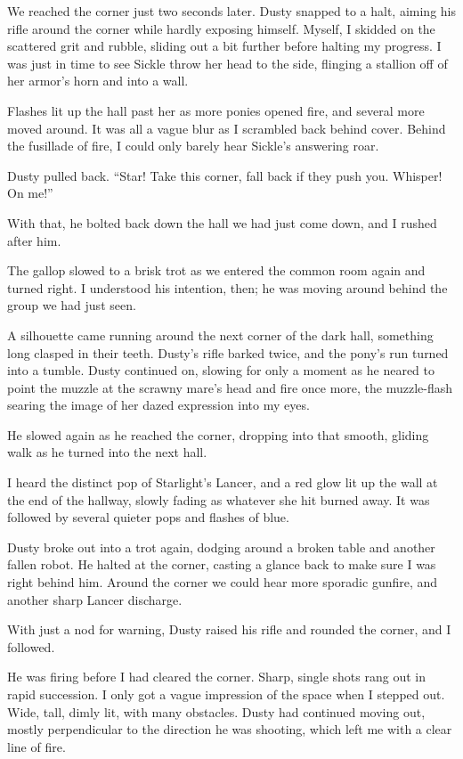We reached the corner just two seconds later. Dusty snapped to a halt, aiming his rifle around the corner while hardly exposing himself. Myself, I skidded on the scattered grit and rubble, sliding out a bit further before halting my progress. I was just in time to see Sickle throw her head to the side, flinging a stallion off of her armor’s horn and into a wall.

Flashes lit up the hall past her as more ponies opened fire, and several more moved around. It was all a vague blur as I scrambled back behind cover. Behind the fusillade of fire, I could only barely hear Sickle’s answering roar.

Dusty pulled back. “Star! Take this corner, fall back if they push you. Whisper! On me!”

With that, he bolted back down the hall we had just come down, and I rushed after him.

The gallop slowed to a brisk trot as we entered the common room again and turned right. I understood his intention, then; he was moving around behind the group we had just seen.

A silhouette came running around the next corner of the dark hall, something long clasped in their teeth. Dusty’s rifle barked twice, and the pony’s run turned into a tumble. Dusty continued on, slowing for only a moment as he neared to point the muzzle at the scrawny mare’s head and fire once more, the muzzle-flash searing the image of her dazed expression into my eyes.

He slowed again as he reached the corner, dropping into that smooth, gliding walk as he turned into the next hall.

I heard the distinct pop of Starlight’s Lancer, and a red glow lit up the wall at the end of the hallway, slowly fading as whatever she hit burned away. It was followed by several quieter pops and flashes of blue.

Dusty broke out into a trot again, dodging around a broken table and another fallen robot. He halted at the corner, casting a glance back to make sure I was right behind him. Around the corner we could hear more sporadic gunfire, and another sharp Lancer discharge.

With just a nod for warning, Dusty raised his rifle and rounded the corner, and I followed.

He was firing before I had cleared the corner. Sharp, single shots rang out in rapid succession. I only got a vague impression of the space when I stepped out. Wide, tall, dimly lit, with many obstacles. Dusty had continued moving out, mostly perpendicular to the direction he was shooting, which left me with a clear line of fire.

